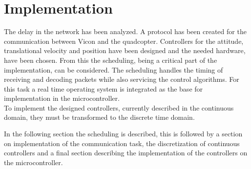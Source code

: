 \chapter{Implementation}
The delay in the network has been analyzed. A protocol has been created for the communication between Vicon and the quadcopter. Controllers for the attitude, translational velocity and position have been designed and the needed hardware, have been chosen. From this the scheduling, being a critical part of the implementation, can be considered. The scheduling handles the timing of receiving and decoding packets while also servicing the control algorithms. For this task a real time operating system is integrated as the base for implementation in the microcontroller.\\
To implement the designed controllers, currently described in the continuous domain, they must be transformed to the discrete time domain.

In the following section the scheduling is described, this is followed by a section on implementation of the communication task, the discretization of continuous controllers and a final section describing the implementation of the controllers on the microcontroller.